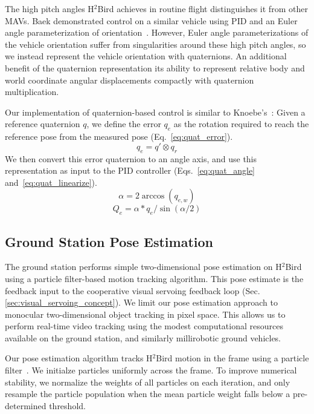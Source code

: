\documentclass{aamas2013}
\begin{document}
The high pitch angles H$^2$Bird achieves in routine flight distinguishes it 
from other MAVs. Baek 
demonstrated control on a similar vehicle using PID and an Euler angle
parameterization of orientation~\cite{baek:tracking}. However, Euler angle parameterizations of the vehicle orientation 
suffer from singularities around these high pitch angles, so we instead 
represent the vehicle orientation with quaternions. An additional benefit of 
the quaternion representation its ability to represent relative body and 
world coordinate angular displacements compactly with quaternion 
multiplication.

Our implementation of quaternion-based control is similar to Knoebe's~\cite{knoebe:quatcontrol}:
Given a reference quaternion $q$, we define the error $q_e$ as the rotation 
required to reach the reference pose from the measured pose (Eq.~\ref{eq:quat_error}). 
\begin{equation}
\label{eq:quat_error}
q_e = q'\otimes q_r
\end{equation}
We then convert this error quaternion to an angle axis, and use this 
representation as input to the PID controller 
(Eqs.~\ref{eq:quat_angle} and~\ref{eq:quat_linearize}). 
\begin{equation}
\label{eq:quat_angle}
\alpha = 2\arccos(q_{e,w})
\end{equation}
\begin{equation}
\label{eq:quat_linearize}
Q_e = \alpha*q_e/\sin(\alpha /2)
\end{equation}

\subsection{Ground Station Pose Estimation}
The ground station performs simple two-dimensional pose estimation on 
H$^2$Bird using a particle filter-based motion tracking algorithm. This pose 
estimate is the feedback input to the cooperative visual servoing feedback 
loop (Sec. \ref{sec:visual_servoing_concept}). We limit our pose estimation 
approach to monocular two-dimensional object tracking in pixel space. This 
allows us to perform real-time video tracking using the modest computational 
resources available on the ground station, and similarly millirobotic ground 
vehicles.

Our pose estimation algorithm tracks H$^2$Bird motion in the frame using a 
particle filter~\cite{thrun2005probabilistic}. We initialze particles 
uniformly across the frame. To improve numerical stability, we  normalize the 
weights of all particles on each iteration, and only resample the particle 
population when the mean particle weight falls below a pre-determined 
threshold.
\end{document}
